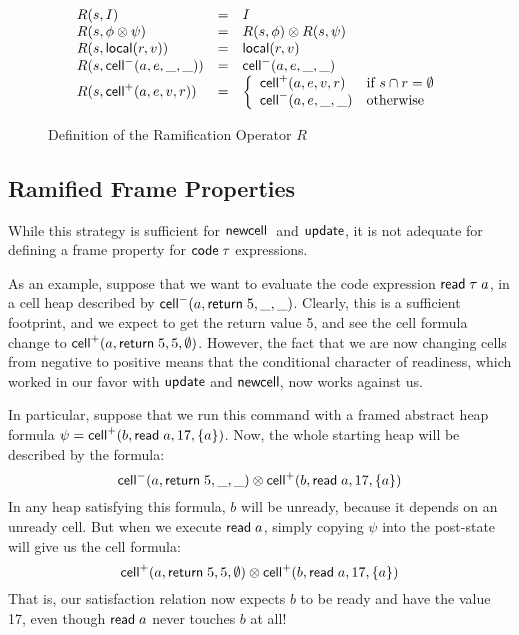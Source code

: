 \documentclass[preprint,natbib]{sigplanconf}
\begin{document}
\begin{figure}
{\small
  \begin{displaymath}
    \begin{array}{lcl}
      R(s, I)                 & = & I \\
      R(s, \phi \otimes \psi) & = & R(s, \phi) \otimes R(s, \psi) \\
      R(s, \mbox{\textsf{{local}}}({r}, {v}))   & = & \mbox{\textsf{{local}}}({r}, {v}) \\
      R(s, \mbox{\textsf{{cell}}}^{-}({a}, {e}, {\_}, {\_}))    & = & \mbox{\textsf{{cell}}}^{-}({a}, {e}, {\_}, {\_}) \\
      R(s, \mbox{\textsf{{cell}}}^{+}({a}, {e}, {v}, {r})) & = & \left\{\begin{array}{ll}
                                                \mbox{\textsf{{cell}}}^{+}({a}, {e}, {v}, {r}) 
                                              & \mbox{if } s \cap r = \emptyset \\
                                                \mbox{\textsf{{cell}}}^{-}({a}, {e}, {\_}, {\_})
                                              & \mbox{otherwise}
                                              \end{array}
                                       \right.
    \end{array}
  \end{displaymath}
}
\caption{Definition of the Ramification Operator $R$}
\label{ramify-def}
\end{figure}

\subsection{Ramified Frame Properties}

While this strategy is sufficient for $\mbox{\textsf{{newcell}}}\;$ and
$\mbox{\textsf{{update}}}$, it is not adequate for defining a frame property
for $\mbox{\textsf{{code}}}\;{\tau}$ expressions. 

As an example, suppose that we want to evaluate the code expression $\mbox{\textsf{{read}}}\; \tau\;
a$, in a cell heap described by $\mbox{\textsf{{cell}}}^{-}({a}, {\mbox{\textsf{{return}}}\; 5}, {\_}, {\_})$.  Clearly,
this is a sufficient footprint, and we expect to get the return
value 5, and see the cell formula change to $\mbox{\textsf{{cell}}}^{+}({a}, {\mbox{\textsf{{return}}}\;
  5}, {5}, {\emptyset})$.  However, the fact that we are now changing cells
from negative to positive means that the conditional character of
readiness, which worked in our favor with $\mbox{\textsf{{update}}}$ and
$\mbox{\textsf{{newcell}}}\;\!\!$, now works against us.

In particular, suppose that we run this command with a framed abstract heap
formula $\psi = \mbox{\textsf{{cell}}}^{+}({b}, {\mbox{\textsf{{read}}}\; a}, {17}, {\{{a}\}})$. Now, the
whole starting heap will be described by the formula:
\begin{displaymath}
\mbox{\textsf{{cell}}}^{-}({a}, {\mbox{\textsf{{return}}}\; 5}, {\_}, {\_}) \otimes \mbox{\textsf{{cell}}}^{+}({b}, {\mbox{\textsf{{read}}}\; a}, {17}, {\{{a}\}})  
\end{displaymath}
In any heap satisfying this formula, $b$ will be unready, because it depends 
on an unready cell. But when we execute $\mbox{\textsf{{read}}}\; a$, simply copying $\psi$ 
into the post-state will give us the cell formula:
\begin{displaymath}
\mbox{\textsf{{cell}}}^{+}({a}, {\mbox{\textsf{{return}}}\; 5}, {5}, {\emptyset}) \otimes \mbox{\textsf{{cell}}}^{+}({b}, {\mbox{\textsf{{read}}}\; a}, {17}, {\{{a}\}})
\end{displaymath}
That is, our satisfaction relation now expects $b$ to be ready and have the 
value 17, even though $\mbox{\textsf{{read}}}\; a$ never touches $b$ at all!
\end{document}
